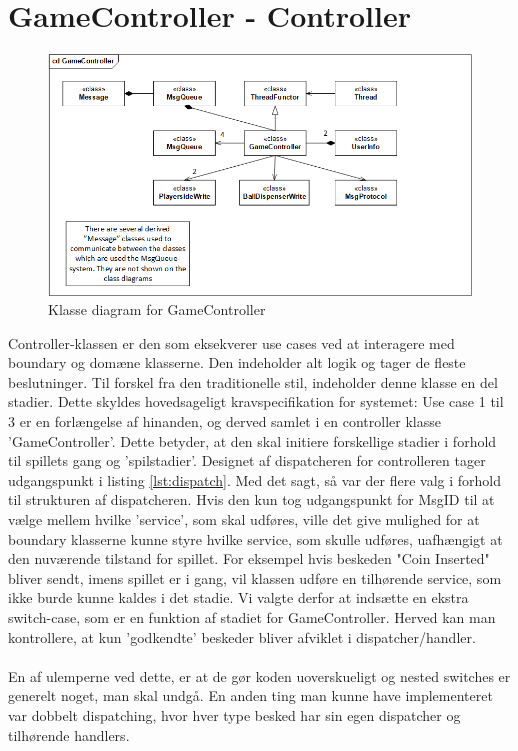 \documentclass[Softwaredesign/Softwaredesign_main.tex]{subfiles}
\begin{document}
\section{GameController - Controller}
\begin{figure}[H]
    \centering
    \includegraphics[width=1\textwidth]{Softwaredesign/RPiApp/graphic_RPi/GC.png}
    \caption{Klasse diagram for GameController}
   \label{fig:cd_GC}
\end{figure}
Controller-klassen er den som eksekverer use cases ved at interagere med boundary og domæne klasserne. Den indeholder alt logik og tager de fleste beslutninger. Til forskel fra den traditionelle stil, indeholder denne klasse en del stadier. Dette skyldes hovedsageligt kravspecifikation for systemet: Use case 1 til 3 er en forlængelse af hinanden, og derved samlet i en controller klasse 'GameController'. Dette betyder, at den skal initiere forskellige stadier i forhold til spillets gang og 'spilstadier'. Designet af dispatcheren for controlleren tager udgangspunkt i listing \ref{lst:dispatch}. Med det sagt, så var der flere valg i forhold til strukturen af dispatcheren. Hvis den kun tog udgangspunkt for MsgID til at vælge mellem hvilke 'service', som skal udføres, ville det give mulighed for at boundary klasserne kunne styre hvilke service, som skulle udføres, uafhængigt at den nuværende tilstand for spillet. For eksempel hvis beskeden "Coin Inserted" bliver sendt, imens spillet er i gang, vil klassen udføre en tilhørende service, som ikke burde kunne kaldes i det stadie. Vi valgte derfor at indsætte en ekstra switch-case, som er en funktion af stadiet for GameController. Herved kan man kontrollere, at kun 'godkendte' beskeder bliver afviklet i dispatcher/handler. 
\\\\En af ulemperne ved dette, er at de gør koden uoverskueligt og nested switches er generelt noget, man skal undgå. En anden ting man kunne have implementeret var dobbelt dispatching, hvor hver type besked har sin egen dispatcher og tilhørende handlers.
\end{document}
